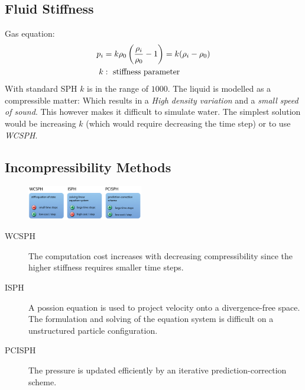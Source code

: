 \begin{multicols}{2}
\subsection{Fluid Stiffness}
Gas equation:
\begin{align*}
	p_i &= k\rho_0 \left({\rho_i \over \rho_0} - 1\right) = k(\rho_i-\rho_0)\\
	k &: \text{ stiffness parameter}
\end{align*}
With standard SPH $k$ is in the range of $1000$. The liquid is modelled as a compressible matter: Which results in a \emph{High density variation} and a \emph{small speed of sound}. This however makes it difficult to simulate water. The simplest solution would be increasing $k$ (which would require decreasing the time step) or to use \emph{WCSPH}.

\subsection{Incompressibility Methods}

\begin{figure}[H]
	\centering
	\includegraphics[width=0.45\textwidth]{img/05_incompressibility_methods}
\end{figure}
\begin{description}
	\item[WCSPH] The computation cost increases with decreasing compressibility since the higher stiffness requires smaller time steps.
	\item[ISPH] A possion equation is used to project velocity onto a divergence-free space. The formulation and solving of the equation system is difficult on a unstructured particle configuration.
	\item[PCISPH] The pressure is updated efficiently by an iterative prediction-correction scheme.
\end{description}


\end{multicols}
